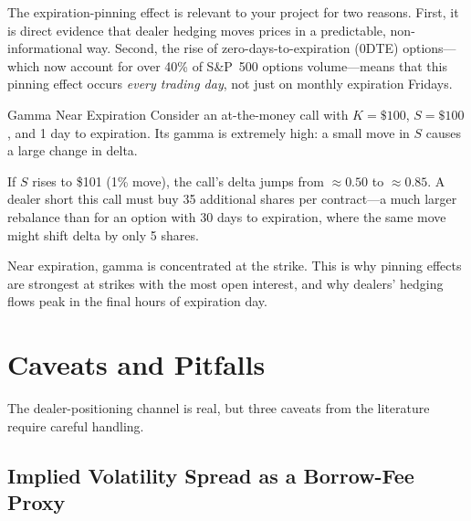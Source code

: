 The expiration-pinning effect is relevant to your project for two
reasons.  First, it is direct evidence that dealer hedging moves
prices in a predictable, non-informational way.  Second, the rise of
zero-days-to-expiration (0DTE) options---which now account for over
40\% of S\&P~500 options volume---means that this pinning effect
occurs \emph{every trading day}, not just on monthly expiration
Fridays.

\begin{workedexample}{Gamma Near Expiration}
Consider an at-the-money call with $K = \$100$, $S = \$100$, and
1 day to expiration.  Its gamma is extremely high: a small move in
$S$ causes a large change in delta.

If $S$ rises to \$101 (1\% move), the call's delta jumps from
$\approx 0.50$ to $\approx 0.85$.  A dealer short this call must
buy 35 additional shares per contract---a much larger rebalance than
for an option with 30 days to expiration, where the same move might
shift delta by only 5 shares.

Near expiration, gamma is concentrated at the strike.  This is why
pinning effects are strongest at strikes with the most open interest,
and why dealers' hedging flows peak in the final hours of expiration
day.
\end{workedexample}


\section{Caveats and Pitfalls}
\label{sec:microstructure-caveats}

The dealer-positioning channel is real, but three caveats
from the literature require careful handling.

\subsection{Implied Volatility Spread as a Borrow-Fee Proxy}

